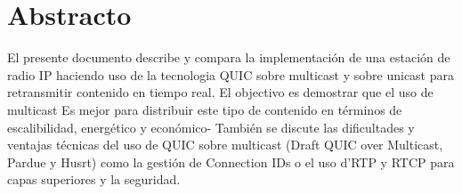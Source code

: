 \section*{Abstracto}

{
    El presente documento describe y compara la implementación de una estación de radio \ac{IP} haciendo uso de la tecnologia QUIC 
    sobre multicast y sobre unicast para retransmitir contenido en tiempo real. El objectivo es demostrar que el uso de multicast Es
    mejor para distribuir este tipo de contenido en términos de escalibilidad, energético y económico- También se discute las dificultades 
    y ventajas técnicas del uso de QUIC sobre multicast (Draft QUIC over Multicast, Pardue y Husrt) como la gestión de Connection IDs o
    el uso d'\ac{RTP} y \ac{RTCP} para capas superiores y la seguridad.
}
